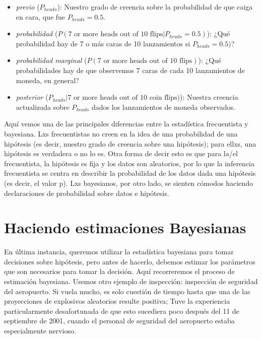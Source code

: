 \documentclass[
  12pt,
]{book}
\providecommand{\tightlist}{%
  \setlength{\itemsep}{0pt}\setlength{\parskip}{0pt}}
\theoremstyle{definition}
\theoremstyle{definition}
\theoremstyle{definition}
\theoremstyle{remark}
\begin{document}
\begin{itemize}
\tightlist
\item
  \emph{previo} (\(P_ {heads}\)): Nuestro grado de creencia sobre la probabilidad de que caiga en cara, que fue \(P_ {heads} = 0.5\).
\item
  \emph{probabilidad} (\(P(\text{7 or more heads out of 10 flips}|P_{heads}=0.5)\)): ¿Qué probabilidad hay de 7 o más caras de 10 lanzamientos si \(P_{heads}=0.5)\)?
\item
  \emph{probabilidad marginal} (\(P(\text{7 or more heads out of 10 flips})\)): ¿Qué probabilidades hay de que observemos 7 caras de cada 10 lanzamientos de moneda, en general?
\item
  \emph{posterior} (\(P_{heads}|\text{7 or more heads out of 10 coin flips})\)): Nuestra creencia actualizada sobre \(P_{heads}\) dados los lanzamientos de moneda observados.
\end{itemize}

Aquí vemos una de las principales diferencias entre la estadística frecuentista y bayesiana. Lxs frecuentistas no creen en la idea de una probabilidad de una hipótesis (es decir, nuestro grado de creencia sobre una hipótesis); para ellxs, una hipótesis es verdadera o no lo es. Otra forma de decir esto es que para la/el frecuentista, la hipótesis es fija y los datos son aleatorios, por lo que la inferencia frecuentista se centra en describir la probabilidad de los datos dada una hipótesis (es decir, el valor p). Lxs bayesianos, por otro lado, se sienten cómodos haciendo declaraciones de probabilidad sobre datos e hipótesis.

\hypertarget{doing-bayesian-estimation}{%
\section{Haciendo estimaciones Bayesianas}\label{doing-bayesian-estimation}}

En última instancia, queremos utilizar la estadística bayesiana para tomar decisiones sobre hipótesis, pero antes de hacerlo, debemos estimar los parámetros que son necesarios para tomar la decisión. Aquí recorreremos el proceso de estimación bayesiana. Usemos otro ejemplo de inspección: inspección de seguridad del aeropuerto. Si vuela mucho, es solo cuestión de tiempo hasta que una de las proyecciones de explosivos aleatorios resulte positiva; Tuve la experiencia particularmente desafortunada de que esto sucediera poco después del 11 de septiembre de 2001, cuando el personal de seguridad del aeropuerto estaba especialmente nervioso.
\end{document}
